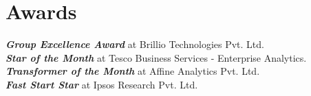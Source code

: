 \section{Awards}
  \begin{itemize}[leftmargin=0.1in, label={}]
    \normalsize{
      \item{
        \textit{\textbf{Group Excellence Award}} at Brillio Technologies Pvt. Ltd. \\
        \textit{\textbf{Star of the Month}} at Tesco Business Services - Enterprise Analytics. \\
        \textit{\textbf{Transformer of the Month}} at Affine Analytics Pvt. Ltd. \\
        \textit{\textbf{Fast Start Star}} at Ipsos Research Pvt. Ltd.
      }
    }
  \end{itemize}
